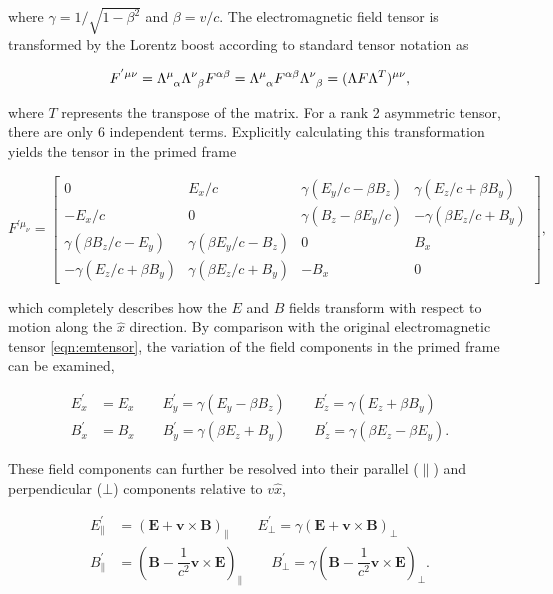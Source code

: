 where $\gamma = {1}/{\sqrt{1-\beta^2}}$ and $\beta = v/c$. The electromagnetic field tensor is transformed by the Lorentz boost according to standard tensor notation as

\begin{equation}
F^{'\mu\nu} = \tensor{\Lambda}{^\mu_\alpha} \tensor{\Lambda}{^\nu_\beta} F^{\alpha \beta} 
= \tensor{\Lambda}{^\mu_\alpha} F^{\alpha \beta} \tensor{\Lambda}{^\nu_\beta}  
= (\Lambda F \Lambda^T)^{\mu \nu},
\end{equation}

where $T$ represents the transpose of the matrix. For a rank 2 asymmetric tensor, there are only $6$ independent terms. Explicitly calculating this transformation yields the tensor in the primed frame

\begin{equation}
F^{'\mu_\nu} =
\begin{bmatrix}
0		&	E_x/c	&	\gamma ( E_y/c - \beta B_z)	&	\gamma ( E_z/c + \beta B_y) \\
-E_x/c	&	0	&	\gamma ( B_z - \beta E_y/c)	&	-\gamma (\beta E_z/c + B_y) \\
\gamma ( \beta B_z/c - E_y)	&	\gamma ( \beta E_y/c - B_z)	& 0	& B_x \\ 
-\gamma ( E_z/c + \beta B_y)	&	\gamma ( \beta E_z/c + B_y)	& -B_x	& 0
\end{bmatrix},
\end{equation}

which completely describes how the $E$ and $B$ fields transform with respect to motion along the $\hat{x}$ direction. By comparison with the original electromagnetic tensor \ref{eqn:emtensor}, the variation of the field components in the primed frame can be examined,

\begin{align}
E^{'}_{x} &= E_x 
\qquad E^{'}_{y} = \gamma ( E_y - \beta B_z)	
\qquad E^{'}_{z} = \gamma ( E_z + \beta B_y) \\
B^{'}_{x} &= B_x 
\qquad B^{'}_{y} = \gamma ( \beta E_z + B_y)
\qquad B^{'}_{z} = \gamma ( \beta E_z - \beta E_y).
\end{align}

These field components can further be resolved into their parallel ($\parallel$) and perpendicular ($\bot$) components relative to  $v \hat{x}$,

\begin{align}
E^{'}_{\parallel} &= (\bm{E}+\bm{v} \times \bm{B})_\parallel
\qquad E^{'}_{\bot} = \gamma (\bm{E}+\bm{v} \times \bm{B})_\bot  \label{EMinkowski}\\
B^{'}_{\parallel} &= (\bm{B}-\dfrac{1}{c^2}\bm{v} \times \bm{E})_\parallel
\qquad B^{'}_{\bot} = \gamma (\bm{B}-\dfrac{1}{c^2}\bm{v} \times \bm{E})_\bot \label{BMinkowski}.
\end{align}

